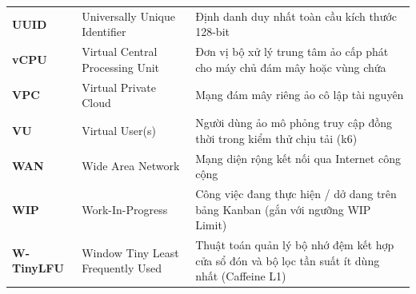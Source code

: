 \begin{longtable}{P{.14\textwidth}P{.30\textwidth}P{.47\textwidth}}
\textbf{UUID} & Universally Unique Identifier & Định danh duy nhất toàn cầu kích thước 128-bit \\
\textbf{vCPU} & Virtual Central Processing Unit & Đơn vị bộ xử lý trung tâm ảo cấp phát cho máy chủ đám mây hoặc vùng chứa \\
\textbf{VPC} & Virtual Private Cloud & Mạng đám mây riêng ảo cô lập tài nguyên \\
\textbf{VU} & Virtual User(s) & Người dùng ảo mô phỏng truy cập đồng thời trong kiểm thử chịu tải (k6) \\
\textbf{WAN} & Wide Area Network & Mạng diện rộng kết nối qua Internet công cộng \\
\textbf{WIP} & Work-In-Progress & Công việc đang thực hiện / dở dang trên bảng Kanban (gắn với ngưỡng WIP Limit) \\
\textbf{W-TinyLFU} & Window Tiny Least Frequently Used & Thuật toán quản lý bộ nhớ đệm kết hợp cửa sổ đón và bộ lọc tần suất ít dùng nhất (Caffeine L1) \\
\bottomrule
\end{longtable}
\endgroup
